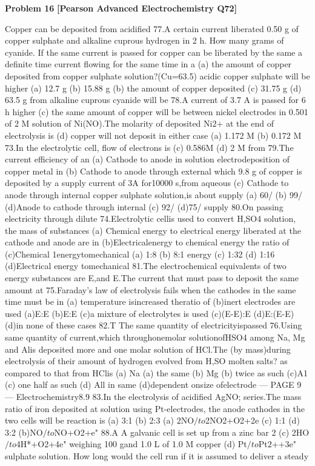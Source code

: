 \begin{problembox}
\textbf{Problem 16} \hfill \textbf{[Pearson Advanced Electrochemistry Q72]}
\label{q:ext-pearson-16}

Copper can be deposited from acidified
77.A certain current liberated 0.50 g of
copper sulphate and alkaline cuprous
hydrogen in 2 h. How many grams of
cyanide. If the same current is passed for
copper can be liberated by the same
a definite time
current flowing for the same time in a
(a) the amount of copper deposited from
copper sulphate solution?(Cu=63.5)
acidic copper sulphate will be higher
(a) 12.7 g
(b) 15.88 g
(b) the amount of copper deposited
(c) 31.75 g
(d) 63.5 g
from alkaline cuprous cyanide will be
78.A current of 3.7 A is passed for 6 h
higher
(c) the same amount of copper will be
between nickel electrodes in 0.501 of 2 M
solution of Ni(NO).The molarity of
deposited
Ni$2$+ at the end of electrolysis is
(d) copper will not deposit in either case
(a) 1.172 M
(b) 0.172 M
73.In the electrolytic cell, flow of electrons is
(c) 0.586M
(d) 2 M
from
79.The
current
efficiency
of
an
(a) Cathode to anode in solution
electrodeposition of copper metal in
(b) Cathode to anode through external
which 9.8 g of copper is deposited by a
supply
current of 3A for10000 s,from aqueous
(c) Cathode to anode through internal
copper sulphate solution,is about
supply
(a) 60/%
(b) 99/%
(d)Anode to cathode through internal
(c) 92/%
(d)75/%
supply
80.On passing electricity through dilute
74.Electrolytic cellis used to convert
H,SO4 solution, the mass of substances
(a) Chemical energy to electrical energy
liberated at the cathode and anode are in
(b)Electricalenergy to chemical energy
the ratio of
(c)Chemical
1energytomechanical
(a) 1:8
(b) 8:1
energy
(c) 1:32
(d) 1:16
(d)Electrical
energy
tomechanical
81.The electrochemical equivalents of two
energy
substances are E,and E.The current that
must pass to deposit the same amount at
75.Faraday's law of electrolysis fails when
the cathodes in the same time must be in
(a) temperature isincreased
theratio of
(b)inert electrodes are used
(a)E:E
(b)E:E
(c)a mixture of electrolytes is used
(c)(E-E):E
(d)E:(E-E)
(d)in none of these cases
82.T
The same quantity of electricityispassed
76.Using same quantity of current,which
throughonemolar solutionofHSO4
among Na, Mg and Alis deposited more
and one molar solution of HCl.The
(by mass)during electrolysis of their
amount of hydrogen evolved from H,SO
molten salts?
as compared to that from HClis
(a) Na
(a) the same
(b) Mg
(b) twice as such
(c)A1
(c) one half as such
(d) All in same
(d)dependent onsize ofelectrode
--- PAGE 9 ---
Electrochemistry8.9
83.In the electrolysis of acidified AgNO;
series.The mass ratio of iron deposited at
solution using Pt-electrodes, the anode
cathodes in the two cells will be
reaction is
(a) 3:1
(b) 2:3
(a) 2NO$/to$2NO2+O2+2e
(c) 1:1
(d) 3:2
(b)NO$/to$NO+O2+e"
88.A
A galvanic cell is set up from a zinc bar
2
(c) 2HO$/to$4H*+O2+4e"
weighing 100 gand 1.0 L of 1.0 M copper
(d) Pt$/to$Pt$2$++3e"
sulphate solution. How long would the
cell run if it is assumed to deliver a steady
\end{problembox}

